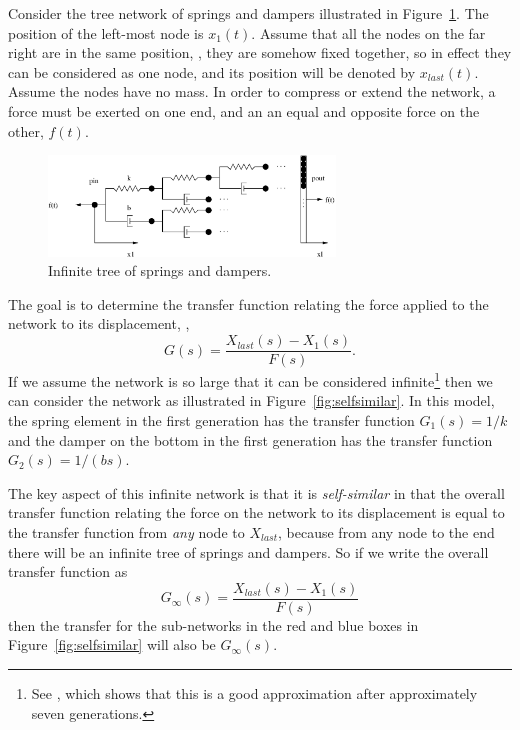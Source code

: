 \begin{example}
  Consider the tree network of springs and dampers illustrated in Figure~\ref{fig:structure}. The position of the left-most node is $x_1(t)$. Assume that all the nodes on the far right are in the same position, \ie, they are somehow fixed together, so in effect they can be considered as one node, and its position will be denoted by $x_{last}(t)$. Assume the nodes have no mass.  In order to compress or extend the network, a force must be exerted on one end, and an an equal and opposite force on the other, $f(t)$. 

  \begin{figure}
	\centering
	\includegraphics[width=3in]{figs/structure}
	\caption{Infinite tree of springs and dampers.}
	\label{fig:structure}
  \end{figure}

  The goal is to determine the transfer function relating the force applied to the network to its displacement, \ie,
  \begin{equation}
	G(s) = \frac{X_{last}(s) - X_1(s)}{F(s)}.
	\label{eq:xfer}
  \end{equation}
  If we assume the network is so large that it can be considered infinite\footnote{See \cite{mayes}, which shows that this is a good approximation after approximately seven generations.} then we can consider the network as illustrated in Figure~\ref{fig:selfsimilar}. In this model, the spring element in the first generation has the transfer function $G_1(s) = 1/k$ and the damper on the bottom in the first generation has the transfer function $G_2(s) = 1/(b s)$.  

  The key aspect of this infinite network is that it is \emph{self-similar} in that the overall transfer function relating the force on the network to its displacement is equal to the transfer function from \emph{any} node to $X_{last}$, because from any node to the end there will be an infinite tree of springs and dampers. So if we write the overall transfer function as
  \begin{equation}
	G_\infty(s) = \frac{X_{last}(s) - X_1(s)}{F(s)}
  \end{equation}
  then the transfer for the sub-networks in the red and blue boxes in Figure~\ref{fig:selfsimilar} will also be $G_\infty(s)$. 


\end{example}
